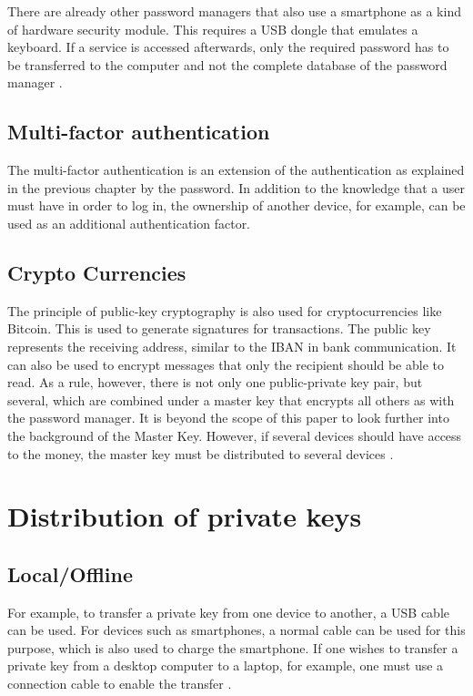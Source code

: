 \documentclass[12pt,oneside,a4paper,parskip]{scrbook}
\begin{document}
There are already other password managers that also use a smartphone as a kind of hardware security module. This requires a USB dongle that emulates a keyboard. If a service is accessed afterwards, only the required password has to be transferred to the computer and not the complete database of the password manager \parencite{noauthor_phraselock_nodate}.

\subsection{Multi-factor authentication}
The multi-factor authentication is an extension of the authentication as explained in the previous chapter by the password. In addition to the knowledge that a user must have in order to log in, the ownership of another device, for example, can be used as an additional authentication factor. 

\subsection{Crypto Currencies}
The principle of public-key cryptography is also used for cryptocurrencies like Bitcoin. This is used to generate signatures for transactions. 
The public key represents the receiving address, similar to the IBAN in bank communication. It can also be used to encrypt messages that only the recipient should be able to read. As a rule, however, there is not only one public-private key pair, but several, which are combined under a master key that encrypts all others as with the password manager. It is beyond the scope of this paper to look further into the background of the Master Key. However, if several devices should have access to the money, the master key must be distributed to several devices \parencite{btcecho_bitcoin_2018}.


\section{Distribution of private keys}
\label{sec:distribution}

\subsection{Local/Offline}
For example, to transfer a private key from one device to another, a USB cable can be used. For devices such as smartphones, a normal cable can be used for this purpose, which is also used to charge the smartphone. If one wishes to transfer a private key from a desktop computer to a laptop, for example, one must use a connection cable to enable the transfer \parencite{stiemer_linkkabel_2017}.
\end{document}
